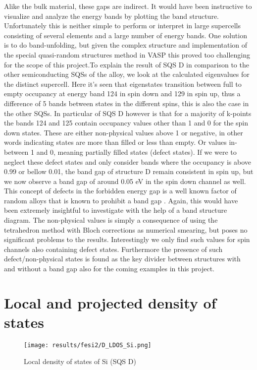 Alike the bulk material, these gaps are indirect. It would have been instructive to visualize and analyze the energy bands by plotting the band structure. Unfortunately this is neither simple to perform or interpret in large supercells consisting of several elements and a large number of energy bands. One solution is to do band-unfolding, but given the complex structure and implementation of the special quasi-random structures method in VASP this proved too challenging for the scope of this project.To explain the result of SQS D in comparison to the other semiconducting SQSs of the alloy, we look at the calculated eigenvalues for the distinct supercell. Here it's seen that eigenstates transition between full to empty occupancy at energy band 124 in spin down and 129 in spin up, thus a difference of 5 bands between states in the different spins, this is also the case in the other SQSs. In particular of SQS D however is that for a majority of k-points the bands 124 and 125 contain occupancy values other than 1 and 0 for the spin down states. These are either non-physical values above 1 or negative, in other words indicating states are more than filled or less than empty. Or values in-between 1 and 0, meaning partially filled states (defect states). If we were to neglect these defect states and only consider bands where the occupancy is above 0.99 or bellow 0.01, the band gap of structure D remain consistent in spin up, but we now observe a band gap of around 0.05 eV in the spin down channel as well. This concept of defects in the forbidden energy gap is a well known factor of random alloys that is known to prohibit a band gap \cite{PhysRevLett.104.236403}. Again, this would have been extremely insightful to investigate with the help of a band structure diagram. The non-physical values is simply a consequence of using the tetrahedron method with Bloch corrections as numerical smearing, but poses no significant problems to the results. Interestingly we only find such values for spin channels also containing defect states. Furthermore the presence of such defect/non-physical states is found as the key divider between structures with and without a band gap also for the coming examples in this project.  
 
\section{Local and projected density of states}
  
\begin{figure}[H]
	\centering
	\texttt{[image: results/fesi2/D\_LDOS\_Si.png]}
	\caption{Local density of states of Si (SQS D)}
\end{figure} 

